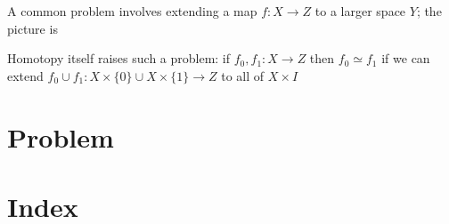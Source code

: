 \documentclass[11pt]{article}
\begin{document}
A common problem involves extending a map \(f:X\to Z\) to a larger space \(Y\); the picture is
\begin{center}\end{center}
Homotopy itself raises such a problem: if \(f_0,f_1:X\to Z\) then \(f_0\simeq f_1\) if we can
extend \(f_0\cup f_1:X\times\{0\}\cup X\times\{1\}\to Z\) to all of \(X\times I\)


\section{Problem}
\label{sec:orgaf7b91d}
\label{Problem1}

\section{Index}
\label{sec:orgd79a4c8}
\renewcommand{\indexname}{}
\printindex
\end{document}

